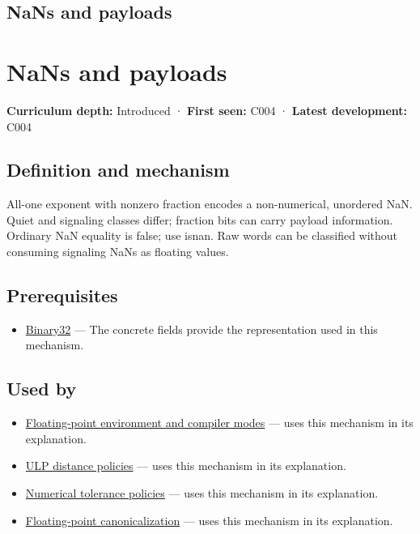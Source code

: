 \hypertarget{appendix-d6607cc4c235}{}
\section*{NaNs and payloads}
\chapter{NaNs and payloads}\label{appendix-d6607cc4c235-nans-and-payloads}

\textbf{Curriculum depth:} Introduced · \textbf{First seen:} C004 · \textbf{Latest development:} C004

\section{Definition and mechanism}\label{appendix-d6607cc4c235-definition-and-mechanism}

All-one exponent with nonzero fraction encodes a non-numerical, unordered NaN. Quiet and signaling classes differ; fraction bits can carry payload information. Ordinary NaN equality is false; use isnan. Raw words can be classified without consuming signaling NaNs as floating values.

\section{Prerequisites}\label{appendix-d6607cc4c235-prerequisites}

\begin{itemize}
\tightlist
\item
  \hyperref[appendix-5057f9ad327f]{Binary32} --- The concrete fields provide the representation used in this mechanism.
\end{itemize}

\section{Used by}\label{appendix-d6607cc4c235-used-by}

\begin{itemize}
\tightlist
\item
  \hyperref[appendix-f11d1a521253]{Floating-point environment and compiler modes} --- uses this mechanism in its explanation.
\item
  \hyperref[appendix-deca299ae4b8]{ULP distance policies} --- uses this mechanism in its explanation.
\item
  \hyperref[appendix-0ec599f8ba27]{Numerical tolerance policies} --- uses this mechanism in its explanation.
\item
  \hyperref[appendix-e90053a4b201]{Floating-point canonicalization} --- uses this mechanism in its explanation.
\end{itemize}

